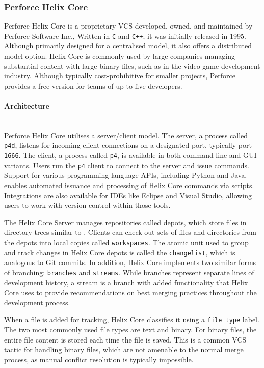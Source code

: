 \subsubsection{Perforce Helix Core}
\label{sec:perforce}
Perforce Helix Core is a proprietary VCS developed, owned, and maintained by Perforce Software Inc., Written in \lstinline{C} and \lstinline{C++}; it was initially released in 1995. Although primarily designed for a centralised model, it also offers a distributed model option. Helix Core is commonly used by large companies managing substantial content with large binary files, such as in the video game development industry. Although typically cost-prohibitive for smaller projects, Perforce provides a free version for teams of up to five developers.
\paragraph{Architecture}
\hfill\medskip\\
Perforce Helix Core utilises a server/client model. The server, a process called \lstinline{p4d}, listens for incoming client connections on a designated port, typically port \lstinline{1666}. The client, a process called \lstinline{p4}, is available in both command-line and GUI variants. Users run the \lstinline{p4} client to connect to the server and issue commands. Support for various programming language APIs, including Python and Java, enables automated issuance and processing of Helix Core commands via scripts. Integrations are also available for IDEs like Eclipse and Visual Studio, allowing users to work with version control within those tools.
\smallskip

The Helix Core Server manages repositories called depots, which store files in directory trees similar to . Clients can check out sets of files and directories from the depots into local copies called \lstinline{workspaces}. The atomic unit used to group and track changes in Helix Core depots is called the \lstinline{changelist}, which is analogous to Git commits. In addition, Helix Core implements two similar forms of branching: \lstinline{branches} and \lstinline{streams}. While branches represent separate lines of development history, a stream is a branch with added functionality that Helix Core uses to provide recommendations on best merging practices throughout the development process.
\smallskip

When a file is added for tracking, Helix Core classifies it using a \lstinline{file type} label. The two most commonly used file types are text and binary. For binary files, the entire file content is stored each time the file is saved. This is a common VCS tactic for handling binary files, which are not amenable to the normal merge process, as manual conflict resolution is typically impossible.
\smallskip

